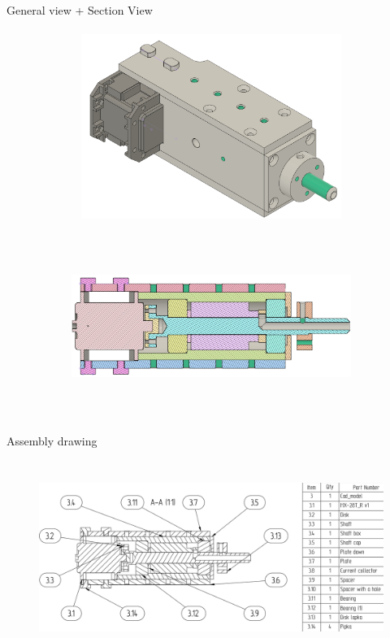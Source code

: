 \documentclass[aspectratio=169]{beamer}
\newcommand{\fbckg}[1]{\usebackgroundtemplate{\texttt{[image: \#1]}}}%
\begin{document}
\begin{frame}[t]{General view + Section View}
    \framesubtitle{}
    \begin{figure}[H]
        \begin{subfigure}[c]{0.44\textwidth}
            \centering\includegraphics[height=6cm,width=1\textwidth,keepaspectratio]{motor_box v16_isometric_view.png}
            \label{fig:motor_box v16_isometric_view.png}
        \end{subfigure}
        \begin{subfigure}[c]{0.54\textwidth}
            \centering\includegraphics[height=6cm,width=1\textwidth,keepaspectratio]{motor_box v16_section_view.png}
            \label{fig:motor_box v16_section_view.png}
        \end{subfigure}
    \end{figure}
\end{frame}

\begin{frame}[t]{Assembly drawing}
\framesubtitle{}
\vspace{-0.6cm}
\begin{figure}[H]
    \centering\includegraphics[height=6cm,width=1\textwidth,keepaspectratio]{parts.png}
    \label{fig:parts.png}
\end{figure}
\end{frame}

\fbckg{fibeamer/figs/last_page.png}
\frame[plain]{}
\end{document}
